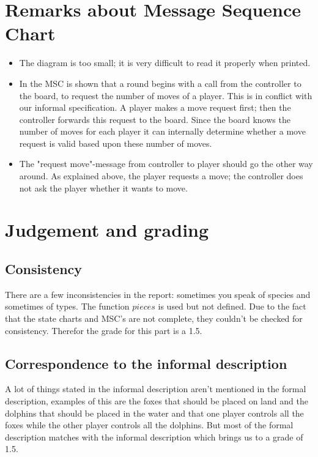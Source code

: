 \documentclass[a4paper,11pt]{article}
\begin{document}
    \section{Remarks about Message Sequence Chart}
    \begin{itemize}
        \item The diagram is too small; it is very difficult to read it properly when printed.
        \item In the MSC is shown that a round begins with a call from the controller to the board, to request the number of moves of a player. This is in conflict with our informal specification. A player makes a move request first; then the controller forwards this request to the board. Since the board knows the number of moves for each player it can internally determine whether a move request is valid based upon these number of moves.
        \item The "request move"-message from controller to player should go the other way around. As explained above, the player requests a move; the controller does not ask the player whether it wants to move.
    \end{itemize}


    \section{Judgement and grading}
    \subsection{Consistency}
    There are a few inconsistencies in the report: sometimes you speak of species and sometimes of types. The function $pieces$ is used but not defined. Due to the fact that the state charts and MSC's are not complete, they couldn't be checked for consistency. Therefor the grade for this part is a 1.5.\\
    
    \subsection{Correspondence to the informal description}
    A lot of things stated in the informal description aren't mentioned in the formal description, examples of this are the foxes that should be placed on land and the dolphins that should be placed in the water and that one player controls all the foxes while the other player controls all the dolphins. But most of the formal description matches with the informal description which brings us to a grade of 1.5.\\
\end{document}
